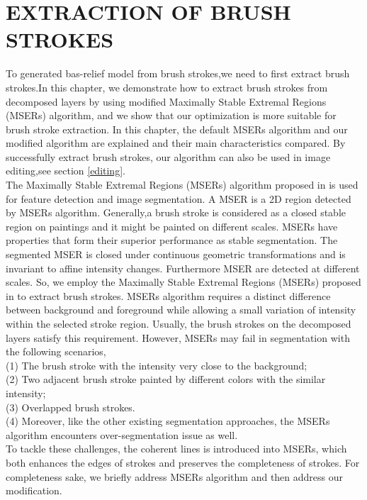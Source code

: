 \clearpage
\chapter{EXTRACTION OF BRUSH STROKES}\label{extract}
To generated bas-relief model from brush strokes,we need to first extract brush strokes.In this chapter, we demonstrate how to extract brush strokes from decomposed layers by using modified Maximally Stable Extremal Regions (MSERs) algorithm, and we show that our optimization is more suitable for brush stroke extraction. In this chapter, the default MSERs algorithm \cite{donoser2006efficient} and our modified algorithm are explained and their main characteristics compared. By successfully extract brush strokes, our algorithm can also be used in image editing,see section \ref{editing}.\\
The Maximally Stable Extremal Regions (MSERs) algorithm proposed in \cite{donoser2006efficient} is used for feature detection and image segmentation. A MSER is a 2D region detected by MSERs algorithm.  Generally,a brush stroke is considered as a closed stable region on paintings and it might be painted on different scales. MSERs have properties that form their superior performance as stable segmentation. The segmented MSER is closed under continuous geometric transformations and is invariant to affine intensity changes. Furthermore MSER are detected at different scales. So, we employ the Maximally Stable Extremal Regions (MSERs) proposed in \cite{donoser2006efficient} to extract brush strokes. MSERs algorithm requires a distinct difference between background and foreground while allowing a small variation of intensity within the selected stroke region. Usually, the brush strokes on the decomposed layers satisfy this requirement.
However, MSERs may fail in segmentation with the following scenarios,\\ 
(1) The brush stroke with the intensity very close to the background; \\
(2) Two adjacent brush stroke painted by different colors with the similar intensity;\\
(3) Overlapped brush strokes.\\
(4) Moreover, like the other existing segmentation approaches, the MSERs algorithm encounters over-segmentation issue as well. \\
To tackle these challenges, the coherent lines \cite{kang2007coherent} is introduced into MSERs, which both enhances the edges of strokes and preserves the completeness of strokes. For completeness sake, we briefly address MSERs algorithm and then address our modification.

